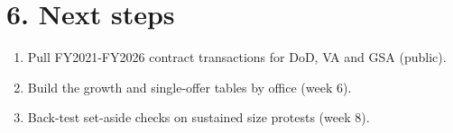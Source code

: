 \documentclass[letterpaper,11pt]{article}
\providecommand{\tightlist}{\setlength{\itemsep}{0pt}\setlength{\parskip}{0pt}}
\begin{document}
\hypertarget{next-steps}{%
\section*{6. Next steps}\label{next-steps}}

\begin{enumerate}
\def\labelenumi{\arabic{enumi}.}
\tightlist
\item
  Pull FY2021-FY2026 contract transactions for DoD, VA and GSA (public).
\item
  Build the growth and single-offer tables by office (week 6).
\item
  Back-test set-aside checks on sustained size protests (week 8).
\end{enumerate}
\end{document}
